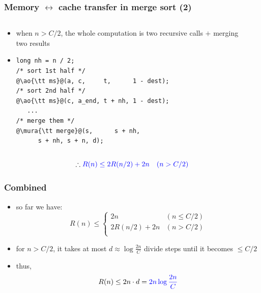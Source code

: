 \documentclass[12pt,dvipdfmx]{beamer}
\newcommand{\mura}[1]{{\color{purple}#1}}
\newcommand{\ao}[1]{{\color{blue}#1}}
\begin{document}
\begin{frame}[fragile]
\frametitle{Memory $\leftrightarrow$ cache transfer in merge sort (2)}
\begin{columns}
\begin{column}{0.5\textwidth}
\begin{itemize}
\item when $n > C/2$, 
the whole computation is two recursive calls $+$ merging two results
\item []
\begin{lstlisting}
long nh = n / 2;
/* sort 1st half */
@\ao{\tt ms}@(a, c,     t,      1 - dest);
/* sort 2nd half */
@\ao{\tt ms}@(c, a_end, t + nh, 1 - dest);
   ...
/* merge them */
@\mura{\tt merge}@(s,      s + nh, 
      s + nh, s + n, d);
\end{lstlisting}
\end{itemize}
\end{column}

\begin{column}{0.5\textwidth}
\begin{center}
\def\svgwidth{0.8\textwidth}
%
\only<2>{\scriptsize}%
%
\end{center}
\end{column}
\end{columns}

\[
\therefore \ao{R(n)  \leq  2R(n/2) + 2n \quad (n > C/2)}
\]
\end{frame}

\begin{frame}[fragile]
\frametitle{Combined}
\begin{itemize}
\item so far we have:
\begin{equation*}
R(n) \leq  
\left\{
\begin{array}{ll}
2n           & (n \leq C/2) \\
2R(n/2) + 2n & (n > C/2) \\
\end{array}
\right.
\end{equation*}

\item for $n > C/2$, it takes at most
$d \approx \log\frac{2n}{C}$ 
divide steps until it becomes $\leq C/2$
\item thus, 
\begin{equation*}
R(n) \leq 2n \cdot d = \ao{2n \log\frac{2n}{C}}
\end{equation*}
\end{itemize}

\begin{center}
\def\svgwidth{0.8\textwidth}  
{\tiny}
\end{center}
\end{frame}
\end{document}
